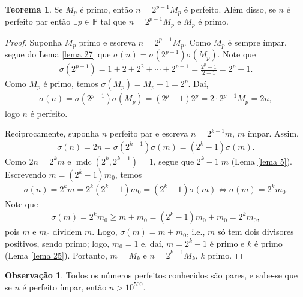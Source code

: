 \documentclass[a4paper,11pt,twoside, leqno]{article}
\DeclareMathOperator{\mdc}{mdc}
\theoremstyle{definition}
\newtheorem{theorem}{Teorema}[section]
\newtheorem{remark}{Observação}[section]
\begin{document}
\begin{theorem}
	Se $M_p$ é primo, então $n = 2^{p-1}M_p$ é perfeito. Além disso, se $n$ é perfeito par então $\exists p\in\mathbb{P}$ tal que $n = 2^{p-1}M_p$ e $M_p$ é primo.
\end{theorem}
\begin{proof}
	Suponha $M_p$ primo e escreva $n = 2^{p-1}M_p$. Como $M_p$ é sempre ímpar, segue do Lema \eqref{lema 27} que $\sigma(n) = \sigma(2^{p-1})\sigma(M_p)$. Note que
	\begin{align*}
	\sigma(2^{p-1}) = 1 + 2 + 2^2 + \cdots + 2^{p-1} = \frac{2^p - 1}{2-1} = 2^p - 1.
	\end{align*}
	Como $M_p$ é primo, temos $\sigma(M_p) = M_p + 1 = 2^p$. Daí, 
	\begin{align*}
	\sigma(n) = \sigma(2^{p-1})\sigma(M_p) = (2^p - 1)2^p = 2\cdot 2^{p-1}M_p = 2n,
	\end{align*}
	logo $n$ é perfeito.
	
	Reciprocamente, suponha $n$ perfeito par e escreva $n = 2^{k-1}m$, $m$ ímpar. Assim, 
	\begin{align*}
	\sigma(n) = 2n = \sigma(2^{k-1})\sigma(m) = (2^k - 1)\sigma(m).
	\end{align*}
	Como $2n = 2^km$ e $\mdc(2^k, 2^{k-1})=1$, segue que $2^k - 1|m$ (Lema \eqref{lema 5}). Escrevendo $m = (2^k - 1)m_0$, temos
	\begin{align*}
	\sigma(n) = 2^km = 2^k(2^k - 1)m_0 = (2^k - 1)\sigma(m) \Leftrightarrow \sigma(m) = 2^km_0.
	\end{align*}
	Note que
	\begin{align*}
	\sigma(m) = 2^km_0\geq m + m_0 = (2^k - 1)m_0 + m_0 = 2^km_0,
	\end{align*}
	pois $m$ e $m_0$ dividem $m$. Logo, $\sigma(m) = m+m_0$, i.e., $m$ só tem dois divisores positivos, sendo primo; logo, $m_0 = 1$ e, daí, $m = 2^k - 1$ é primo e $k$ é primo (Lema \eqref{lema 25}). Portanto, $m = M_k$ e $n = 2^{k-1}M_k$, $k$ primo.
\end{proof}
\begin{remark}
	\label{obs 6}
	Todos os números perfeitos conhecidos são pares, e sabe-se que se $n$ é perfeito ímpar, então $n > 10^{500}$.
\end{remark}
\end{document}
